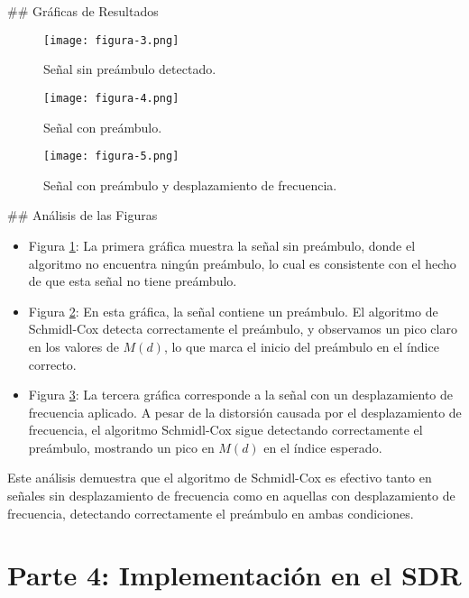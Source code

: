 \documentclass[letterpaper,12pt,oneside]{article}
\begin{document}
## Gráficas de Resultados

\begin{figure}[H]
    \centering
    \texttt{[image: figura-3.png]}
    \caption{Señal sin preámbulo detectado.}
    \label{fig:offset1}
\end{figure}

\begin{figure}[H]
    \centering
    \texttt{[image: figura-4.png]}
    \caption{Señal con preámbulo.}
    \label{fig:offset2}
\end{figure}

\begin{figure}[H]
    \centering
    \texttt{[image: figura-5.png]}
    \caption{Señal con preámbulo y desplazamiento de frecuencia. }
    \label{fig:offset3}
\end{figure}

## Análisis de las Figuras

\begin{itemize}
    \item Figura \ref{fig:offset1}: La primera gráfica muestra la señal sin preámbulo, donde el algoritmo no encuentra ningún preámbulo, lo cual es consistente con el hecho de que esta señal no tiene preámbulo.
    
    \item Figura \ref{fig:offset2}: En esta gráfica, la señal contiene un preámbulo. El algoritmo de Schmidl-Cox detecta correctamente el preámbulo, y observamos un pico claro en los valores de \(M(d)\), lo que marca el inicio del preámbulo en el índice correcto.
    
    \item Figura \ref{fig:offset3}: La tercera gráfica corresponde a la señal con un desplazamiento de frecuencia aplicado. A pesar de la distorsión causada por el desplazamiento de frecuencia, el algoritmo Schmidl-Cox sigue detectando correctamente el preámbulo, mostrando un pico en \(M(d)\) en el índice esperado.
\end{itemize}

Este análisis demuestra que el algoritmo de Schmidl-Cox es efectivo tanto en señales sin desplazamiento de frecuencia como en aquellas con desplazamiento de frecuencia, detectando correctamente el preámbulo en ambas condiciones.

\section{Parte 4: Implementación en el SDR}
\end{document}
